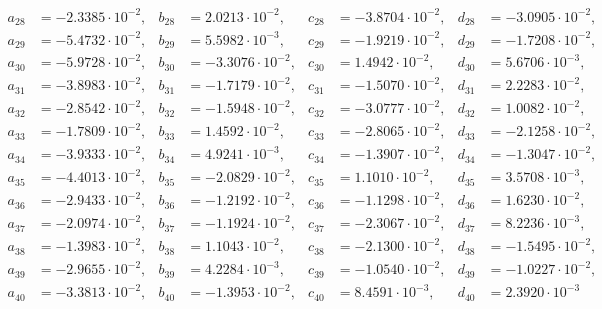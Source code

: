 \begin{align*}
  a_{ 28 } &= -2.3385 \cdot 10^{ -2 }, & b_{ 28 } &= 2.0213 \cdot 10^{ -2 }, & c_{ 28 } &= -3.8704 \cdot 10^{ -2 }, & d_{ 28 } &= -3.0905 \cdot 10^{ -2 }, \\ 
  a_{ 29 } &= -5.4732 \cdot 10^{ -2 }, & b_{ 29 } &= 5.5982 \cdot 10^{ -3 }, & c_{ 29 } &= -1.9219 \cdot 10^{ -2 }, & d_{ 29 } &= -1.7208 \cdot 10^{ -2 }, \\ 
  a_{ 30 } &= -5.9728 \cdot 10^{ -2 }, & b_{ 30 } &= -3.3076 \cdot 10^{ -2 }, & c_{ 30 } &= 1.4942 \cdot 10^{ -2 }, & d_{ 30 } &= 5.6706 \cdot 10^{ -3 }, \\ 
  a_{ 31 } &= -3.8983 \cdot 10^{ -2 }, & b_{ 31 } &= -1.7179 \cdot 10^{ -2 }, & c_{ 31 } &= -1.5070 \cdot 10^{ -2 }, & d_{ 31 } &= 2.2283 \cdot 10^{ -2 }, \\ 
  a_{ 32 } &= -2.8542 \cdot 10^{ -2 }, & b_{ 32 } &= -1.5948 \cdot 10^{ -2 }, & c_{ 32 } &= -3.0777 \cdot 10^{ -2 }, & d_{ 32 } &= 1.0082 \cdot 10^{ -2 }, \\ 
  a_{ 33 } &= -1.7809 \cdot 10^{ -2 }, & b_{ 33 } &= 1.4592 \cdot 10^{ -2 }, & c_{ 33 } &= -2.8065 \cdot 10^{ -2 }, & d_{ 33 } &= -2.1258 \cdot 10^{ -2 }, \\ 
  a_{ 34 } &= -3.9333 \cdot 10^{ -2 }, & b_{ 34 } &= 4.9241 \cdot 10^{ -3 }, & c_{ 34 } &= -1.3907 \cdot 10^{ -2 }, & d_{ 34 } &= -1.3047 \cdot 10^{ -2 }, \\ 
  a_{ 35 } &= -4.4013 \cdot 10^{ -2 }, & b_{ 35 } &= -2.0829 \cdot 10^{ -2 }, & c_{ 35 } &= 1.1010 \cdot 10^{ -2 }, & d_{ 35 } &= 3.5708 \cdot 10^{ -3 }, \\ 
  a_{ 36 } &= -2.9433 \cdot 10^{ -2 }, & b_{ 36 } &= -1.2192 \cdot 10^{ -2 }, & c_{ 36 } &= -1.1298 \cdot 10^{ -2 }, & d_{ 36 } &= 1.6230 \cdot 10^{ -2 }, \\ 
  a_{ 37 } &= -2.0974 \cdot 10^{ -2 }, & b_{ 37 } &= -1.1924 \cdot 10^{ -2 }, & c_{ 37 } &= -2.3067 \cdot 10^{ -2 }, & d_{ 37 } &= 8.2236 \cdot 10^{ -3 }, \\ 
  a_{ 38 } &= -1.3983 \cdot 10^{ -2 }, & b_{ 38 } &= 1.1043 \cdot 10^{ -2 }, & c_{ 38 } &= -2.1300 \cdot 10^{ -2 }, & d_{ 38 } &= -1.5495 \cdot 10^{ -2 }, \\ 
  a_{ 39 } &= -2.9655 \cdot 10^{ -2 }, & b_{ 39 } &= 4.2284 \cdot 10^{ -3 }, & c_{ 39 } &= -1.0540 \cdot 10^{ -2 }, & d_{ 39 } &= -1.0227 \cdot 10^{ -2 }, \\ 
  a_{ 40 } &= -3.3813 \cdot 10^{ -2 }, & b_{ 40 } &= -1.3953 \cdot 10^{ -2 }, & c_{ 40 } &= 8.4591 \cdot 10^{ -3 }, & d_{ 40 } &= 2.3920 \cdot 10^{ -3 }
\end{align*}
